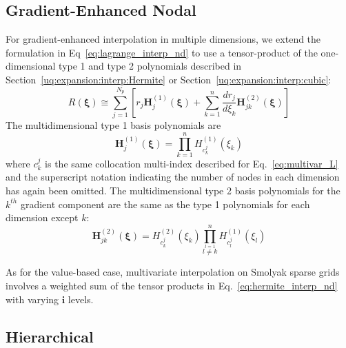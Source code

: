 
\subsection{Gradient-Enhanced Nodal} \label{uq:expansion:sc:gradient}

For gradient-enhanced interpolation in multiple dimensions, we extend
the formulation in Eq~\ref{eq:lagrange_interp_nd} to use a
tensor-product of the one-dimensional type 1 and type 2 polynomials
described in Section~\ref{uq:expansion:interp:Hermite} or
Section~\ref{uq:expansion:interp:cubic}:
\begin{equation}
R(\boldsymbol{\xi}) \cong \sum_{j=1}^{N_p} \left[ 
r_j \boldsymbol{H}_j^{(1)}(\boldsymbol{\xi}) + 
\sum_{k=1}^n \frac{dr_j}{d\xi_k} \boldsymbol{H}_{jk}^{(2)}(\boldsymbol{\xi}) 
\right] \label{eq:hermite_interp_nd}
\end{equation}
The multidimensional type 1 basis polynomials are
\begin{equation}
\boldsymbol{H}_j^{(1)}(\boldsymbol{\xi}) =
\prod_{k=1}^{n} H^{(1)}_{c^j_k}(\xi_k) \label{eq:multivar_H1}
\end{equation}
where $c_k^j$ is the same collocation multi-index described for
Eq.~\ref{eq:multivar_L} and the superscript notation indicating the
number of nodes in each dimension has again been omitted.  The
multidimensional type 2 basis polynomials for the $k^{th}$ gradient
component are the same as the type 1 polynomials for each dimension
except $k$:
\begin{equation}
\boldsymbol{H}_{jk}^{(2)}(\boldsymbol{\xi}) = H^{(2)}_{c^j_k}(\xi_k)
\prod_{\stackrel{\scriptstyle l=1}{l \ne k}}^{n} H^{(1)}_{c^j_l}(\xi_l) 
\label{eq:multivar_H2}
\end{equation}

As for the value-based case, multivariate interpolation on Smolyak
sparse grids involves a weighted sum of the tensor products in
Eq.~\ref{eq:hermite_interp_nd} with varying $\boldsymbol{i}$ levels.

\subsection{Hierarchical} \label{uq:expansion:sc:hierarch}

